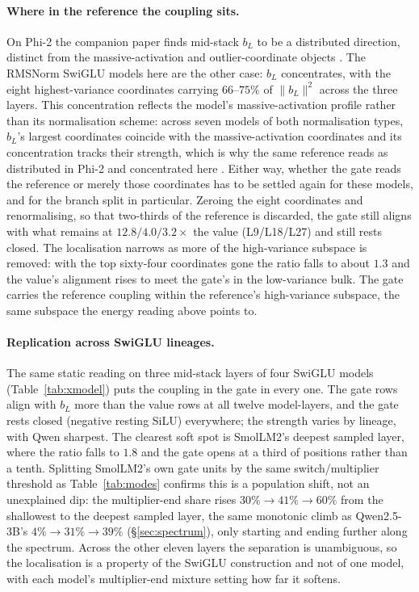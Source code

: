 \documentclass[11pt]{article}
\newcommand{\bl}{b_L}
\begin{document}
\paragraph{Where in the reference the coupling sits.}
On Phi-2 the companion paper finds mid-stack $\bl$ to be a distributed direction,
distinct from the massive-activation and outlier-coordinate objects
\citep{tuomi2026background}. The RMSNorm SwiGLU models here are the other case:
$\bl$ concentrates, with the eight highest-variance coordinates carrying
$66$--$75\%$ of $\lVert\bl\rVert^2$ across the three layers. This concentration
reflects the model's massive-activation profile rather than its normalisation
scheme: across seven models of both normalisation types, $\bl$'s largest
coordinates coincide with the massive-activation coordinates and its
concentration tracks their strength, which is why the same reference reads as
distributed in Phi-2 and concentrated here \citep{sun2024}. Either way, whether
the gate reads the reference or merely those coordinates has to be settled again
for these models, and for the branch split in particular. Zeroing the eight
coordinates and renormalising, so that two-thirds of the reference is discarded,
the gate still aligns with what remains at $12.8 / 4.0 / 3.2\times$ the value
(L9/L18/L27) and still rests closed. The localisation narrows as more of the
high-variance subspace is removed: with the top sixty-four coordinates gone the
ratio falls to about $1.3$ and the value's alignment rises to meet the gate's in
the low-variance bulk. The gate carries the reference coupling within the
reference's high-variance subspace, the same subspace the energy reading above
points to.

\paragraph{Replication across SwiGLU lineages.}
The same static reading on three mid-stack layers of four SwiGLU models
(Table~\ref{tab:xmodel}) puts the coupling in the gate in every one. The gate
rows align with $\bl$ more than the value rows at all twelve model-layers, and
the gate rests closed (negative resting SiLU) everywhere; the strength varies by
lineage, with Qwen sharpest. The clearest soft spot is SmolLM2's deepest sampled
layer, where the ratio falls to $1.8$ and the gate opens at a third of positions
rather than a tenth. Splitting SmolLM2's own gate units by the same
switch/multiplier threshold as Table~\ref{tab:modes} confirms this is a
population shift, not an unexplained dip: the multiplier-end share rises
$30\%\to41\%\to60\%$ from the shallowest to the deepest sampled layer, the same
monotonic climb as Qwen2.5-3B's $4\%\to31\%\to39\%$ (\S\ref{sec:spectrum}), only
starting and ending further along the spectrum. Across the other eleven layers
the separation is unambiguous, so the localisation is a property of the SwiGLU
construction and not of one model, with each model's multiplier-end mixture
setting how far it softens.
\end{document}
